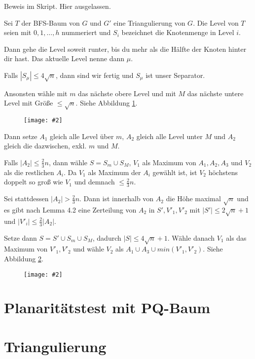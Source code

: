\documentclass[10pt,a4paper]{article}
\makeatletter
\def\maxwidth#1{\ifdim\Gin@nat@width>#1 #1\else\Gin@nat@width\fi}
\newcommand{\imageFigure}[4]{%
    \begin{figure}[h]%
        \centering%
        {%
            \setlength{\fboxsep}{1pt}%
            \setlength{\fboxrule}{1pt}%
            \texttt{[image: \#2]}%
        }%
        \caption{#1}%
        \label{fig:#4}%
    \end{figure}%
}
\makeatother
\begin{document}
Beweis im Skript.
Hier ausgelassen.

Sei $T$ der BFS-Baum von $G$ und $G'$ eine Triangulierung von $G$.
Die Level von $T$ seien mit $0,1,\dots,h$ nummeriert und $S_i$ bezeichnet die
Knotenmenge in Level $i$.

Dann gehe die Level soweit runter, bis du mehr als die Hälfte der Knoten hinter
dir hast.
Das aktuelle Level nenne dann $\mu$.

Falls $|S_\mu| \leq 4\sqrt{n}$, dann sind wir fertig und $S_\mu$ ist unser
Separator.

Ansonsten wähle mit $m$ das nächste obere Level und mit $M$ das nächste untere
Level mit Größe $\leq \sqrt{n}$.
Siehe Abbildung \ref{fig:pst-levels}.

\imageFigure{}{pst-levels.png}{.8}{pst-levels}

Dann setze $A_1$ gleich alle Level über $m$, $A_2$ gleich alle Level unter $M$
und $A_2$ gleich die dazwischen, exkl. $m$ und $M$.

Falls $|A_2| \leq \frac{2}{3}n$, dann wähle $S = S_m \cup S_M$, $V_1$ als
Maximum von $A_1, A_2, A_3$ und $V_2$ als die restlichen $A_i$.
Da $V_1$ als Maximum der $A_i$ gewählt ist, ist $V_2$ höchstens doppelt so groß
wie $V_1$ und demnach $\leq \frac{2}{3}n$.

Sei stattdessen $|A_2| > \frac{2}{3}n$.
Dann ist innerhalb von $A_2$ die Höhe maximal $\sqrt{n}$ und es gibt nach Lemma
4.2 eine Zerteilung von $A_2$ in $S', V'_1, V'_2$ mit $|S'| \leq 2\sqrt{n}+1$
und $|V'_i| \leq \frac{2}{3}|A_2|$.

Setze dann $S = S' \cup S_m \cup S_M$, dadurch $|S| \leq 4\sqrt{n}+1$.
Wähle danach $V_1$ als das Maximum von $V'_1, V'_2$ und wähle $V_2$ als $A_1
\cup A_3 \cup min(V'_1, V'_2)$.
Siehe Abbildung \ref{fig:pst-final}.


\imageFigure{}{pst-final.png}{.95}{pst-final}



\clearpage
\section{Planaritätstest mit PQ-Baum}


\clearpage
\section{Triangulierung}
\end{document}
